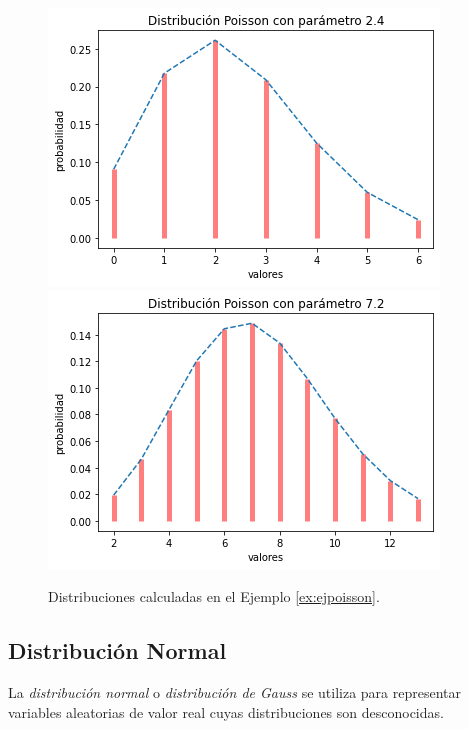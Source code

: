 \documentclass[oneside,openright,titlepage,numbers=noenddot,openany,headinclude,footinclude=true,
cleardoublepage=empty,abstractoff,BCOR=5mm,paper=a4,fontsize=12pt,main=spanish]{scrreprt}
\begin{document}
\begin{figure}[h]
      \includegraphics[width=\linewidth]{images/poisson1.png}
    \endminipage\hfill
      \includegraphics[width=\linewidth]{images/poisson2.png}
    \endminipage
     \caption{Distribuciones calculadas en el Ejemplo \ref{ex:ejpoisson}.}
\end{figure}

\subsection*{Distribución Normal}

La \textit{distribución normal} o  \textit{distribución de Gauss} se utiliza para representar variables aleatorias de valor real cuyas distribuciones son desconocidas.\\
\end{document}
